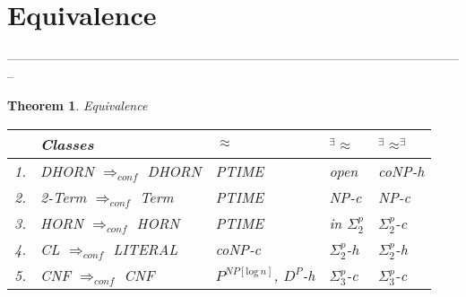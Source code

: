 \documentclass[12pt]{article}
\newcommand{\AEQB}{\mbox{$^\exists\!\!\approx^\exists$}}
\newcommand{\AEQ}{\mbox{$^\exists\!\!\approx$}}
\newtheorem{theorem}{Theorem}[section]
\begin{document}
\section{Equivalence}




--------------------------------------------------------------------------------------------------------------
\begin{theorem}
Equivalence\\

\begin{tabular}{|l|l|l|l|l|}
\hline
 & {\em Classes} &  $\approx$ & \AEQ & \AEQB \\ \hline
1. & DHORN $\Rightarrow_{conf}$ DHORN & PTIME & open & coNP-h\\ \hline
2. & 2-Term $\Rightarrow_{conf}$ Term & PTIME & NP-c & NP-c\\ \hline
3. & HORN  $\Rightarrow_{conf}$ HORN & PTIME & in $\Sigma^p_2$ &  $\Sigma^p_2$-c \\ \hline
4. & CL $\Rightarrow_{conf}$ LITERAL & coNP-c & $\Sigma^p_2$-h & $\Sigma^p_2$-h\\ \hline
5. & CNF $\Rightarrow_{conf}$ CNF & $P^{NP[\text{log}\, n]}$, $D^P$-h  & $\Sigma^p_3$-c& $\Sigma^p_3$-c \\ \hline

\end{tabular}
\end{theorem}
\vspace*{5mm}
\end{document}
